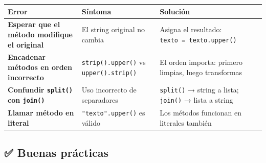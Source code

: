 \documentclass[
  doc,
  floatsintext,
  longtable,
  a4paper,
  nolmodern,
  notxfonts,
  notimes,
  12pt,
  colorlinks=true,linkcolor=blue,citecolor=blue,urlcolor=blue]{apa7}
\newcounter{none} %
\begin{document}
{\def\LTcaptype{none} %
\begin{longtable}[]{@{}
  >{\raggedright\arraybackslash}p{}
  >{\raggedright\arraybackslash}p{}
  >{\raggedright\arraybackslash}p{}@{}}
\toprule\noalign{}
\begin{minipage}[b]{\linewidth}\raggedright
Error
\end{minipage} & \begin{minipage}[b]{\linewidth}\raggedright
Síntoma
\end{minipage} & \begin{minipage}[b]{\linewidth}\raggedright
Solución
\end{minipage} \\
\midrule\noalign{}
\endhead
\bottomrule\noalign{}
\endlastfoot
\textbf{Esperar que el método modifique el original} & El string
original no cambia & Asigna el resultado:
\texttt{texto\ =\ texto.upper()} \\
\textbf{Encadenar métodos en orden incorrecto} &
\texttt{strip().upper()} vs \texttt{upper().strip()} & El orden importa:
primero limpias, luego transformas \\
\textbf{Confundir \texttt{split()} con \texttt{join()}} & Uso incorrecto
de separadores & \texttt{split()} → string a lista; \texttt{join()} →
lista a string \\
\textbf{Llamar método en literal} & \texttt{"texto".upper()} es válido &
Los métodos funcionan en literales también \\
\end{longtable}
}

\subsection{✅ Buenas prácticas}\label{buenas-pruxe1cticas}
\end{document}
